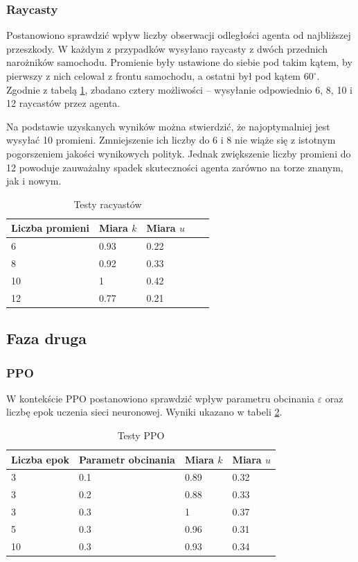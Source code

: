 \documentclass[a4paper,12pt]{article}
\begin{document}
\subsubsection{Raycasty}
Postanowiono sprawdzić wpływ liczby obserwacji odległości agenta od najbliższej przeszkody. W każdym z przypadków wysyłano raycasty z dwóch przednich narożników samochodu. Promienie były ustawione do siebie pod takim kątem, by pierwszy z nich celował z frontu samochodu, a ostatni był pod kątem $60^{\circ}$. Zgodnie z tabelą \ref{tab:raycast}, zbadano cztery możliwości -- wysyłanie odpowiednio 6, 8, 10 i 12 raycastów przez agenta.

Na podstawie uzyskanych wyników można stwierdzić, że najoptymalniej jest wysyłać 10 promieni. Zmniejszenie ich liczby do 6 i 8 nie wiąże się z istotnym pogorszeniem jakości wynikowych polityk. Jednak zwiększenie liczby promieni do 12 powoduje zauważalny spadek skuteczności agenta zarówno na torze znanym, jak i nowym.

\begin{table}[H]
	\centering
	\smallskip
	\begin{tabular}{|l|l|l|l|l|}
		\hline
		Liczba promieni & Miara $k$ & Miara $u$ \\
		\hline
		6 & 0.93 & 0.22 \\		
		8 & 0.92 & 0.33 \\		
		10 & 1 & 0.42 \\		
		12 & 0.77 & 0.21 \\\hline
	\end{tabular}
	\caption{Testy racyastów}
	\label{tab:raycast}
\end{table}


\subsection{Faza druga}
\subsubsection{PPO}
W kontekście PPO postanowiono sprawdzić wpływ parametru obcinania $\varepsilon$ oraz liczbę epok uczenia sieci neuronowej. Wyniki ukazano w tabeli \ref{tab:ppo}.

\begin{table}[H]
	\centering
	\smallskip
	\begin{tabular}{|l|l|l|l|}
		\hline
		Liczba epok & Parametr obcinania & Miara $k$ & Miara $u$ \\
		\hline
		3 & 0.1 & 0.89 & 0.32 \\		
		3 & 0.2 & 0.88 & 0.33 \\		
		3 & 0.3 & 1 & 0.37 \\		
		5 & 0.3 & 0.96 & 0.31 \\
		10 & 0.3 & 0.93 & 0.34 \\\hline
	\end{tabular}
	\caption{Testy PPO}
	\label{tab:ppo}
\end{table}
\end{document}
